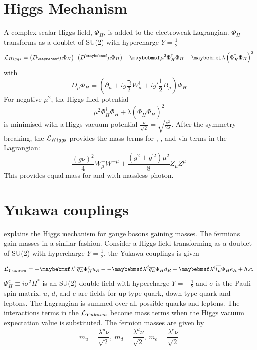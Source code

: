 \section{Higgs Mechanism}
\label{sec:theoryHiggs}
A complex  scalar Higgs field, $\Phi_H$, is added to the electroweak Lagrangian. $\Phi_H$ transforms as a doublet of SU(2) with hypercharge $Y = \frac{1}{2}$
\begin{equation}
\Lagr_{Higgs} = \left(D_\mu\Phi_H\right)^\dagger\left(D^\mu\Phi_H\right) - \mu^2\Phi_H^\dagger\Phi_H - \lambda\left(\Phi_H^\dagger\Phi_H\right)^2
\end{equation}
with
\begin{equation}
D_\mu\Phi_H = \left(\partial_{\mu} + ig\frac{\tau_i}{2}W^i_{\mu} + ig'\frac{1}{2}B_{\mu}\right)\Phi_H
\end{equation}
For negative $\mu^2$, the Higgs filed potential
\begin{equation}
\mu^2\Phi_H^\dagger\Phi_H + \lambda\left(\Phi_H^\dagger\Phi_H\right)^2
\end{equation}
is minimised with a Higgs vacuum potential $\frac{\nu}{\sqrt{2}}=\sqrt{\frac{\nu^2}{2\lambda}} $. After the symmetry breaking, the $\operatorname{\mathcal{L}}_{Higgs}$ provides  the mass terms for \PWp, \PWm, \PZ and \Pgamma via terms in the Lagrangian:
\begin{equation}
\frac{{\left(g\nu\right)}^2}{4}W^+_{\mu}W^{-\mu} + \frac{\left(g^2 + g^{'2}\right)\mu^2}{8}Z_{\mu}Z^{\mu}
\label{eq:theoryBoson}
\end{equation}
This provides equal mass for \PWp and \PWm with massless photon.

\section{Yukawa couplings}

 explains the Higgs mechanism for gauge bosons gaining masses. The fermions gain masses in a similar fashion. Consider a Higgs field transforming as a doublet of SU(2) with hypercharge $Y = \frac{1}{2}$, the Yukawa couplings is given

\begin{equation}
\Lagr_{Yukawa} = -\lambda^{u}\overline{q_L}\Phi_H^{c}u_R - -\lambda^{d}\overline{q_L}\Phi_H{d}_R - \lambda^{e}\overline{l_L}\Phi_{H}e_R + h.c.
\end{equation}
$\Phi_H^{c} \equiv i \sigma^2H^*$ is an SU(2) double field with hypercharge $Y = -\frac{1}{2}$ and $\sigma$ is the Pauli spin matrix. $u$, $d$, and $e$ are fields for up-type quark, down-type quark and leptons. The Lagrangian is summed over all possible quarks and leptons. The interactions terms in the $\operatorname{\mathcal{L}}_{Yukawa}$ become mass terms when the Higgs vacuum expectation value is substituted. The fermion masses are given by
\begin{equation}
m_{u} = \frac{\lambda^u{\nu}}{\sqrt{2}},\ m_{d} = \frac{\lambda^d{\nu}}{\sqrt{2}},\ m_{e} = \frac{\lambda^e{\nu}}{\sqrt{2}}
\end{equation}

